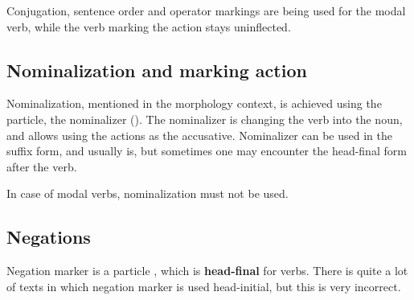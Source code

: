 
Conjugation, sentence order and operator markings are being used for the modal
verb, while the verb marking the action stays uninflected.



\subsection{Nominalization and marking action}

Nominalization, mentioned in the morphology context, is achieved using the
 particle, the nominalizer (\Nmlz{}). The nominalizer is changing the
verb into the noun, and allows using the actions as the accusative. Nominalizer can
be used in the suffix form, and usually is, but sometimes one may encounter the
head-final form after the verb.



In case of modal verbs, nominalization must not be used.

\subsection{Negations}

Negation marker is a particle , which is \textbf{head-final} for
verbs. There is quite a lot of texts in which negation marker is used
head-initial, but this is very incorrect.




